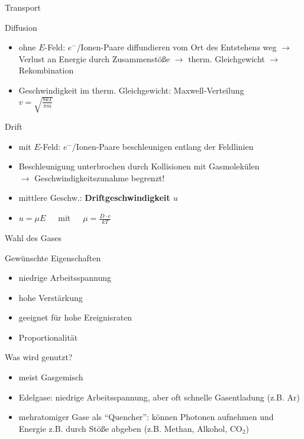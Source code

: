 \begin{frame}{Transport}
	\begin{block}{Diffusion}
	\begin{itemize}
		  \item ohne $E$-Feld: $e^-$/Ionen-Paare diffundieren vom Ort des Entstehens weg $\rightarrow$
		  Verlust an Energie durch Zusammenstöße $\rightarrow$ therm. Gleichgewicht $\rightarrow$
		  Rekombination
		  \item Geschwindigkeit im therm. Gleichgewicht: Maxwell-Verteilung\\
		  		$v=\sqrt{\frac{8kT}{\pi m}}$
		\end{itemize}
	\end{block}
	
	\begin{block}{Drift}
	\begin{itemize}
		  \item mit $E$-Feld: $e^-$/Ionen-Paare beschleunigen entlang der Feldlinien
		  \item Beschleunigung unterbrochen durch Kollisionen mit Gasmolekülen\\
		  		$\rightarrow$ Geschwindigkeitszunahme begrenzt!
		  \item mittlere Geschw.: \bf{Driftgeschwindigkeit $u$}
		  \item $u=\mu E$~~~mit~~~$\mu=\frac{D\cdot e}{kT}$ 
		\end{itemize}
	\end{block}
\end{frame}


\begin{frame}{Wahl des Gases}
	\begin{block}{Gewünschte Eigenschaften}
		\begin{itemize}
		  \item niedrige Arbeitsspannung
		  \item hohe Verstärkung
		  \item geeignet für hohe Ereignisraten
		  \item Proportionalität
		\end{itemize}
	\end{block}
	\begin{block}{Was wird genutzt?}
		\begin{itemize}
			\item meist Gasgemisch
			\item Edelgase: niedrige Arbeitsspannung, aber oft schnelle Gasentladung (z.B. Ar)
			\item mehratomiger Gase als "`Quencher"': können Photonen aufnehmen und Energie z.B. durch
			Stöße abgeben (z.B. Methan, Alkohol, CO$_2$)
		\end{itemize}
	\end{block}
\end{frame}